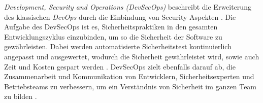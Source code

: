 \textit{Development, Security and Operations (DevSecOps)} beschreibt die Erweiterung des klassischen \textit{DevOps} durch die Einbindung von Security Aspekten \cite{rajapakse_challenges_2022}. Die Aufgabe des DevSecOps ist es, Sicherheitspraktiken in den gesamten Entwicklungszyklus einzubinden, um so die Sicherheit der Software zu gewährleisten. Dabei werden automatisierte Sicherheitstest kontinuierlich angepasst und ausgewertet, wodurch die Sicherheit gewährleistet wird, sowie auch Zeit und Kosten gespart werden \cite{lombardi_devops_2023}. DevSecOps zielt ebenfalls darauf ab, die Zusammenarbeit und Kommunikation von Entwicklern, Sicherheitsexperten und Betriebsteams zu verbessern, um ein Verständnis von Sicherheit im ganzen Team zu bilden \cite{rajapakse_challenges_2022}.


